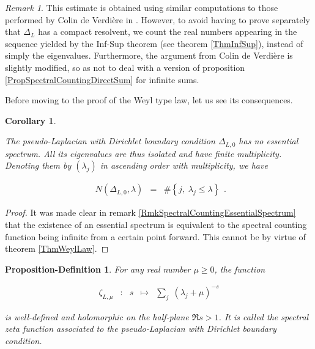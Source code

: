 \documentclass{jams-l}
\newtheorem{proposition-definition}[theorem]{Proposition-Definition}
\newtheorem{corollary}[theorem]{Corollary}
\theoremstyle{definition}
\theoremstyle{remark}
\newtheorem{remark}[theorem]{Remark}
\numberwithin{equation}{section}
\begin{document}
        \begin{remark}
        
            This estimate is obtained using similar computations to those performed by Colin de Verdière in \cite[Thm 6]{MR699488}. However, to avoid having to prove separately that $\Delta_L$ has a compact resolvent, we count the real numbers appearing in the sequence yielded by the Inf-Sup theorem (see theorem \ref{ThmInfSup}), instead of simply the eigenvalues. Furthermore, the argument from Colin de Verdière is slightly modified, so as not to deal with a version of proposition \ref{PropSpectralCountingDirectSum} for infinite sums.
        
        \end{remark}
        
        \noindent Before moving to the proof of the Weyl type law, let us see its consequences.
        
        \begin{corollary}
        \label{CorPseudoLaplacianHasNoEssentialSpectrum}
        
            The pseudo-Laplacian with Dirichlet boundary condition $\Delta_{L,0}$ has no essential spectrum. All its eigenvalues are thus isolated and have finite multiplicity. Denoting them by $\left( \lambda_j \right)$ in ascending order with multiplicity, we have
            
            \[ \begin{array}{lll}
                    N \left( \Delta_{L,0}, \lambda \right) & = & \# \left \{ j, \; \lambda_j \leqslant \lambda \right \}
                \end{array} . \]
        
        \end{corollary}
        
        \begin{proof}
        
            It was made clear in remark \ref{RmkSpectralCountingEssentialSpectrum} that the existence of an essential spectrum is equivalent to the spectral counting function being infinite from a certain point forward. This cannot be by virtue of theorem \ref{ThmWeylLaw}.
        
        \end{proof}
        
        \begin{proposition-definition}
        
            For any real number $\mu \geqslant 0$, the function
            
            \[ \begin{array}{lllll}
                    \zeta_{L, \mu} & : & s & \longmapsto & \sum\limits_j \; \left( \lambda_j + \mu \right)^{-s}
                \end{array} \]
            
            \noindent is well-defined and holomorphic on the half-plane $\Re s > 1$. It is called the spectral zeta function associated to the pseudo-Laplacian with Dirichlet boundary condition.
        
        \end{proposition-definition}
        
\end{document}
